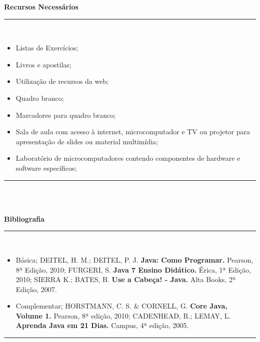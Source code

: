 \begin{center}\textbf{Recursos Necessários}\end{center}
\noindent\rule{16.2cm}{0.4pt}
\\
\begin{itemize} 
  \item Listas de Exercícios;
  \item Livros e apostilas;
  \item Utilização de recursos da web;
  \item Quadro branco;
  \item Marcadores para quadro branco;
  \item Sala de aula com acesso à internet, microcomputador e TV ou projetor para apresentação de slides ou material multimídia;
  \item Laboratório de microcomputadores contendo componentes de hardware e software específicos;
\end{itemize}
\noindent\rule{16.2cm}{0.4pt}\\
\\

\begin{center}\textbf{Bibliografia}\end{center}
\noindent\rule{16.2cm}{0.4pt}
\\
\begin{itemize} 
  \item Básica;
  	\newline DEITEL, H. M.; DEITEL, P. J. \textbf{Java: Como Programar.} Pearson, 8ª Edição, 2010;
	\newline FURGERI, S. \textbf{Java 7 Ensino Didático.} Érica, 1ª Edição, 2010;
	\newline SIERRA K.; BATES, B. \textbf{Use a Cabeça! - Java.} Alta Books, 2ª Edição, 2007.
  \item Complementar;
  	\newline HORSTMANN, C. S. \& CORNELL, G. \textbf{Core Java, Volume 1.} Pearson, 8ª edição, 2010;
	\newline CADENHEAD, R.; LEMAY, L. \textbf{Aprenda Java em 21 Dias.} Campus, 4ª edição, 2005.
  
\end{itemize}
\noindent\rule{16.2cm}{0.4pt}\\
\\

